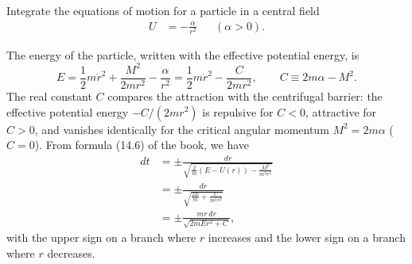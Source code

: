 \begin{problem}[title={Motion in an inverse-cube attractive force}]
{
Integrate the equations of motion for a particle in a central field
\begin{align*}
    U &= -\frac{\alpha}{r^2} & &(\alpha > 0).
\end{align*}
}
{
The energy of the particle, written with the effective potential energy, is
\begin{equation*}
    E = \frac{1}{2}m\Dot{r}^2 + \frac{M^2}{2mr^2} - \frac{\alpha}{r^2} = \frac{1}{2}m\Dot{r}^2 - \frac{C}{2mr^2},
    \qquad C \equiv 2m\alpha - M^2 .
\end{equation*}
The real constant $C$ compares the attraction with the centrifugal barrier: the effective potential energy $-C/(2mr^2)$ is repulsive for $C<0$, attractive for $C>0$, and vanishes identically for the critical angular momentum $M^2 = 2m\alpha$ ($C=0$). From formula (14.6) of the book, we have
\begin{align*}
    dt &= \pm\frac{dr}{\sqrt{\frac{2}{m}\left(E-U(r)\right)-\frac{M^2}{m^2r^2}}} \\
    &= \pm\frac{dr}{\sqrt{\frac{2E}{m}+\frac{C}{m^2r^2}}} \\
    &= \pm\frac{mr\,dr}{\sqrt{2mEr^2+C}},
\end{align*}
with the upper sign on a branch where $r$ increases and the lower sign on a branch where $r$ decreases.

}
\end{problem}
